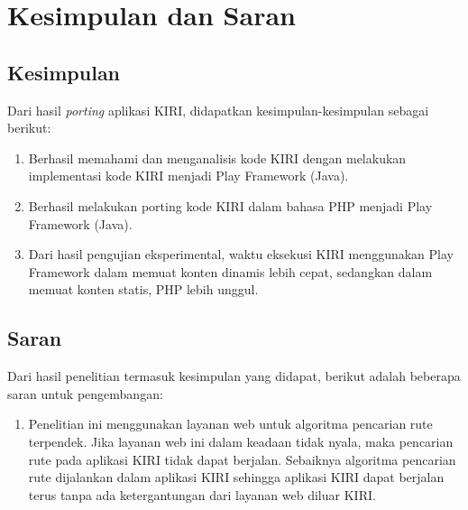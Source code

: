 \chapter{Kesimpulan dan Saran}
\label{chap:kesimpulan_saran}

\section{Kesimpulan}
\label{sec:kesimpulan}

Dari hasil \textit{porting} aplikasi KIRI, didapatkan kesimpulan-kesimpulan sebagai berikut:
	\begin{enumerate}
		\item Berhasil memahami dan menganalisis kode KIRI dengan melakukan implementasi kode KIRI menjadi Play Framework (Java).
		\item Berhasil melakukan porting kode KIRI dalam bahasa PHP menjadi Play Framework (Java). 
		\item Dari hasil pengujian eksperimental, waktu eksekusi KIRI menggunakan Play Framework dalam memuat konten dinamis lebih cepat, sedangkan dalam memuat konten statis, PHP lebih unggul.
	\end{enumerate}

\section{Saran}
\label{sec:saran}
Dari hasil penelitian termasuk kesimpulan yang didapat, berikut adalah beberapa saran untuk pengembangan:
\begin{enumerate}
	\item Penelitian ini menggunakan layanan web untuk algoritma pencarian rute terpendek. Jika layanan web ini dalam keadaan tidak nyala, maka pencarian rute pada aplikasi KIRI tidak dapat berjalan. Sebaiknya algoritma pencarian rute dijalankan dalam aplikasi KIRI sehingga aplikasi KIRI dapat berjalan terus tanpa ada ketergantungan dari layanan web diluar KIRI.
\end{enumerate}